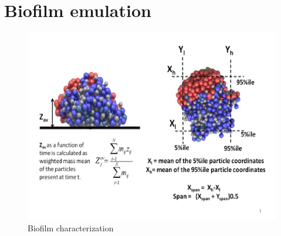 \documentclass[12pt,titlepage]{report}
\theoremstyle{definition}
\theoremstyle{remark}
\begin{document}


\chapter{Biofilm emulation}

\begin{figure}[!ht] 
\includegraphics[width=1.1\textwidth]{result2/bio_char}
\caption[]{Biofilm characterization}\label{diag22}
\end{figure}
\end{document}
